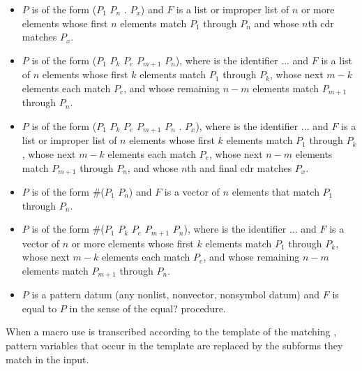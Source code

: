 \begin{entry}{%
\litprotoexpandnoindex{\_}
}
\begin{itemize}
\item $P$ is of the form
{\cf ($P_1$ \dotsfoo{} $P_n$ . $P_x$)}
and $F$ is a list or improper list of $n$ or more elements
whose first $n$ elements match $P_1$ through $P_n$
and
whose $n$th cdr matches $P_x$.

\item $P$ is of the form
{\cf ($P_1$ \dotsfoo{} $P_k$ $P_e$  $P_{m+1}$ \dotsfoo{} $P_n$)},
where  is the identifier {\cf ...}
and $F$ is a list of $n$
elements whose first $k$ elements match $P_1$ through $P_k$,
whose next $m-k$ elements each match $P_e$,
and
whose remaining $n-m$ elements match $P_{m+1}$ through $P_n$.

\item $P$ is of the form
{\cf ($P_1$ \dotsfoo{} $P_k$ $P_e$  $P_{m+1}$ \dotsfoo{} $P_n$ . $P_x$)},
where  is the identifier {\cf ...}
and $F$ is a list or improper list of $n$
elements whose first $k$ elements match $P_1$ through $P_k$,
whose next $m-k$ elements each match $P_e$,
whose next $n-m$ elements match $P_{m+1}$ through $P_n$,
and 
whose $n$th and final cdr matches $P_x$.

\item $P$ is of the form
{\cf \#($P_1$ \dotsfoo{} $P_n$)}
and $F$ is a vector of $n$ elements that match $P_1$ through
$P_n$.

\item $P$ is of the form
{\cf \#($P_1$ \dotsfoo{} $P_k$ $P_e$  $P_{m+1}$ \dotsfoo{} $P_n$)},
where  is the identifier {\cf ...}
and $F$ is a vector of $n$ or more elements
whose first $k$ elements match $P_1$ through $P_k$,
whose next $m-k$ elements each match $P_e$,
and
whose remaining $n-m$ elements match $P_{m+1}$ through $P_n$.

\item $P$ is a pattern datum (any nonlist, nonvector, nonsymbol
datum) and $F$ is equal to $P$ in the sense of the
{\cf equal?} procedure.
\end{itemize}

When a macro use is transcribed according to the template of the
matching , pattern variables that occur in the
template are replaced by the subforms they match in the input.


\end{entry}
